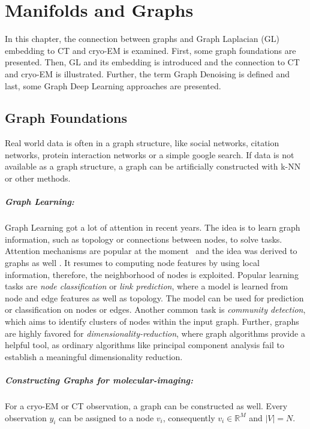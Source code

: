 \chapter{Manifolds and Graphs}
\label{sec:manifold_and_graphs}
    
In this chapter, the connection between graphs and Graph Laplacian (GL) embedding to 
CT and cryo-EM is examined. 
First, some graph foundations are presented.
Then, GL and its embedding is introduced and the connection to CT and cryo-EM is illustrated.
Further, the term Graph Denoising is defined and last, some Graph Deep Learning approaches are presented.


\section{Graph Foundations}
Real world data is often in a graph structure, like social networks, citation networks,
protein interaction networks or a simple google search. 
If data is not available as a graph structure, a graph can be artificially constructed with k-NN or other methods.

\paragraph{Graph Learning:} 
Graph Learning got a lot of attention in recent years.
The idea is to learn graph information, such as topology or connections between nodes, to solve tasks.
Attention mechanisms are popular at the moment~\cite{transformer} and the idea was derived to graphs as well \cite{GAT}.
It resumes to computing node features by using local information, therefore, the neighborhood of nodes is exploited.
Popular learning tasks are \textit{node classification} or \textit{link prediction}, where a model is learned from node and edge features 
as well as topology. The model can be used for prediction or classification on nodes or edges.
Another common task is \textit{community detection}, which aims to identify clusters of nodes within the input graph.
Further, graphs are highly favored for \textit{dimensionality-reduction}, where 
graph algorithms provide a helpful tool, as ordinary algorithms like principal component analysis fail to 
establish a meaningful dimensionality reduction.


\paragraph{Constructing Graphs for molecular-imaging:}
For a cryo-EM or CT observation, a graph can be constructed as well.
Every observation $y_i$ can be assigned to a node $v_i$, consequently $v_i \in \mathbb{R}^M$ and $|V|=N$.

